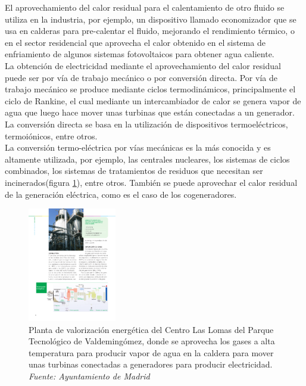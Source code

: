El aprovechamiento del calor residual para el calentamiento de otro fluido se utiliza en la industria, por ejemplo, un dispositivo llamado economizador que se usa en calderas para pre-calentar el fluido, mejorando el rendimiento térmico, o en el sector residencial que aprovecha el calor obtenido en el sistema de enfriamiento de algunos sistemas fotovoltaicos para obtener agua caliente.\\ 

La obtención de electricidad mediante el aprovechamiento del calor residual puede ser por vía de trabajo mecánico o por conversión directa. Por vía de trabajo mecánico se produce mediante ciclos termodinámicos, principalmente el ciclo de Rankine, el cual mediante un intercambiador de calor se genera vapor de agua que luego hace mover unas turbinas que están conectadas a un generador. La conversión directa se basa en la utilización de dispositivos termoeléctricos, termoiónicos, entre otros.\\

La conversión termo-eléctrica por vías mecánicas es la más conocida y es altamente utilizada, por ejemplo, las centrales nucleares, los sistemas de ciclos combinados, los sistemas de tratamientos de residuos que necesitan ser incinerados(figura \ref{fig:esquemaslomasvalorizacion}), entre otros. También se puede aprovechar el calor residual de la generación eléctrica, como es el caso de los cogeneradores.

\begin{figure}[H]
	\centering
	\includegraphics[height=5cm]{figuras/esquemasLomasValorizacion}
	\caption{Planta de valorización energética del Centro Las Lomas del Parque Tecnológico de Valdemingómez, donde se aprovecha los gases a alta temperatura para producir vapor de agua en la caldera para mover unas turbinas conectadas a generadores para producir electricidad. \textit{Fuente: Ayuntamiento de Madrid}}
	\label{fig:esquemaslomasvalorizacion}
\end{figure}

